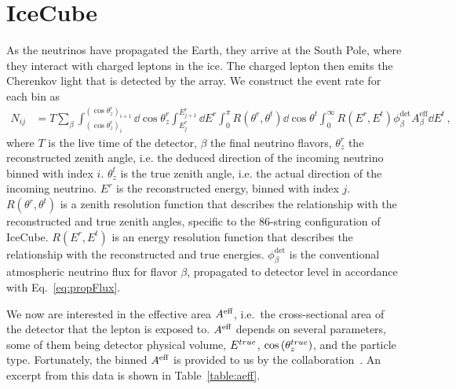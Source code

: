% 
% 

\section{IceCube}\label{ch:ICmethod}
As the neutrinos have propagated the Earth, they arrive at the South Pole, where they interact with charged leptons in the ice. The charged lepton then emits the Cherenkov light that is detected by the array.
We construct the event rate for each bin as
\begin{align}\label{eq:ICevents}
    N_{ij} &= T \sum_\beta\int_{(\cos{\theta_z^r})_i}^{(\cos{\theta_z^r})_{i+1}} \dd \cos{\theta^r_z} \int_{E^r_{j}}^{E^r_{j+1}} \dd E^r 
    \int_0^\pi R(\theta^r,\theta^t) \dd \cos{\theta^t} \int_0^\infty R(E^r,E^t) \phi_\beta^\text{det}  A^\text{eff}_\beta \dd E^t
    \,,
\end{align}
where $T$ is the live time of the detector, $\beta$ the final neutrino flavors, $\theta_z^r$ the reconstructed 
zenith angle, i.e. the deduced direction of the incoming neutrino binned with index $i$. $\theta^t_z$ is the true zenith angle, i.e. the actual direction of the incoming neutrino. 
$E^r$ is the reconstructed energy, binned with index $j$. $R(\theta^r,\theta^t)$ is a zenith resolution function 
that describes the relationship with the reconstructed and true zenith angles, specific to the 86-string configuration of IceCube.
$R(E^r,E^t)$ is an energy resolution function 
that describes the relationship with the reconstructed and true energies. $\phi_\beta^\text{det}$ is the conventional atmospheric neutrino flux for flavor $\beta$, propagated to detector level
in accordance with Eq.~\ref{eq:propFlux}.

We now are interested in the effective area $A^\text{eff}$, 
i.e.~the cross-sectional area of the detector that the lepton is exposed to.
$A^\text{eff}$ depends on several parameters, some of them being detector physical volume, $E^{true}$, $\cos{(\theta_z^{true})}$, and the particle type. 
Fortunately, the binned $A^\text{eff}$ is provided to us by the collaboration~\cite{ICaeff}.
An excerpt from this data is shown in Table~\ref{table:aeff}.

